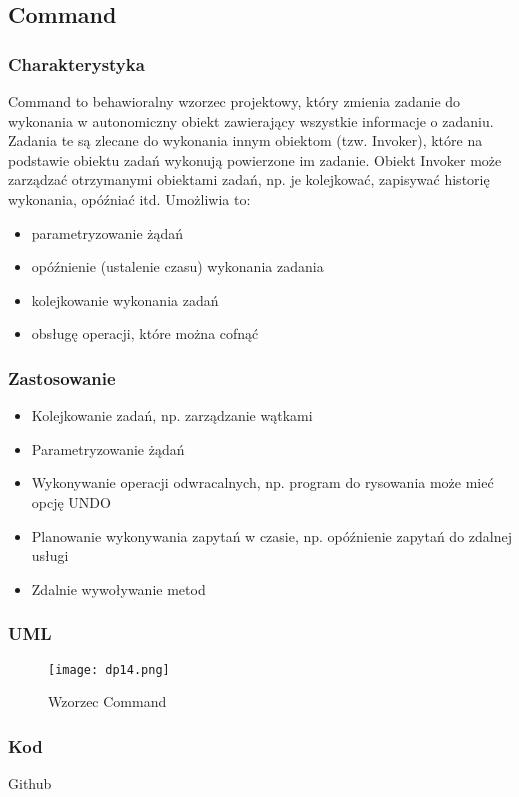 \documentclass[a4paper,15pt]{article}
\begin{document}
\newpage
\subsection{Command}

\subsubsection{Charakterystyka}
Command to behawioralny wzorzec projektowy, który zmienia zadanie do wykonania w autonomiczny obiekt zawierający wszystkie informacje o zadaniu. Zadania te są zlecane do wykonania innym obiektom (tzw. Invoker), które na podstawie obiektu zadań wykonują powierzone im zadanie. Obiekt Invoker może zarządzać otrzymanymi obiektami zadań, np. je kolejkować, zapisywać historię wykonania, opóźniać itd. Umożliwia to:

\begin{itemize}
\item parametryzowanie żądań
\item opóźnienie (ustalenie czasu) wykonania zadania
\item kolejkowanie wykonania zadań
\item obsługę operacji, które można cofnąć
\end{itemize}


\subsubsection{Zastosowanie}
\begin{itemize}
\item Kolejkowanie zadań, np. zarządzanie wątkami 
\item Parametryzowanie żądań
\item Wykonywanie operacji odwracalnych, np. program do rysowania może mieć opcję UNDO
\item Planowanie wykonywania zapytań w czasie, np. opóźnienie zapytań do zdalnej usługi 
\item Zdalnie wywoływanie metod
\end{itemize}


\subsubsection{UML}
\begin{figure}[H]
\centering
  \texttt{[image: dp14.png]}
  \caption{Wzorzec Command}
\end{figure}


\subsubsection{Kod}
Github
\end{document}
